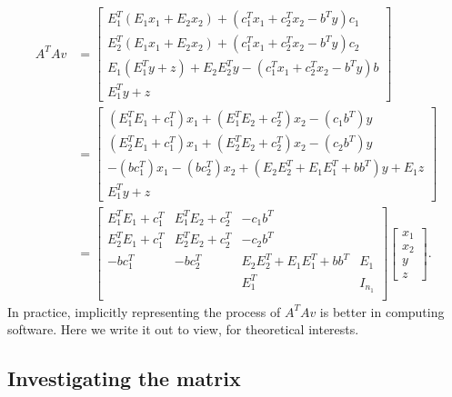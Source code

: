 \documentclass[12pt]{report}
\begin{document}
        \begin{align*}
            A^TAv &= 
            \begin{bmatrix}
                E^T_1(E_1x_1 + E_2x_2) + (c_1^Tx_1 + c_2^Tx_2 - b^Ty)c_1
                \\
                E^T_2(E_1x_1 + E_2x_2) + (c_1^Tx_1 + c_2^Tx_2 - b^Ty)c_2
                \\
                E_1(E_1^Ty + z) + E_2E_2^Ty - (c_1^Tx_1 + c_2^Tx_2 - b^Ty)b
                \\
                E_1^Ty + z
            \end{bmatrix}
            \\
            &= 
            \begin{bmatrix}
                (E_1^TE_1 + c_1^T)x_1 + (E_1^TE_2 + c_2^T)x_2 - (c_1b^T)y
                \\
                (E_2^TE_1 + c_1^T)x_1 + (E_2^TE_2 + c_2^T)x_2 - (c_2b^T)y
                \\
                -(bc_1^T)x_1 - (bc_2^T)x_2 + (E_2E_2^T + E_1E_1^T + bb^T)y
                + E_1z
                \\
                E_1^Ty + z
            \end{bmatrix}
            \\
            &= 
            \begin{bmatrix}
                E_1^TE_1 + c_1^T & E_1^TE_2 + c_2^T & -c_1b^T & \\
                E_2^TE_1 + c_1^T & E_2^TE_2 + c_2^T & -c_2b^T & \\
                -bc_1^T& -bc_2^T & E_2E_2^T + E_1E_1^T + bb^T & E_1 \\
                & & E_1^T & I_{n_1}\\
            \end{bmatrix}
            \begin{bmatrix}
                x_1 \\ x_2 \\ y \\ z
            \end{bmatrix}. 
        \end{align*}
        In practice, implicitly representing the process of $A^TAv$ is better in computing software. 
        Here we write it out to view, for theoretical interests. 
        \subsection{Investigating the matrix}
\end{document}
